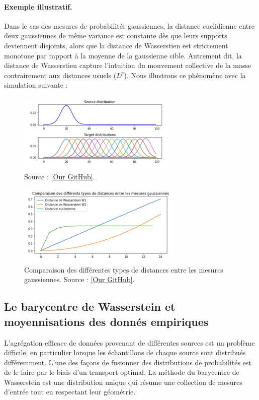 \documentclass[
    8.2pt,
    a4paper,
    logo,
    twocolumn
]{template}
\begin{document}
    \paragraph{Exemple illustratif.} Dans le cas des mesures de probabilités gaussiennes, la distance euclidienne entre deux gaussiennes de même variance est constante dès que leurs supports deviennent disjoints, alors que la distance de Wasserstien est strictement monotone par rapport à la moyenne de la gaussienne cible. Autrement dit, la distance de Wasserstien capture l’intuition du mouvement collective de la masse contrairement aux distances usuels ($L^p$). Nous illustrons ce phénomène avec la simulation suivante :


    \begin{figure}[H]
        \centering
        \includegraphics[width=.5\textwidth]{figures/Image5.png}
        \caption{Source : \href{https://github.com/maranibadr/tranport-optimal/blob/master/notebooks/TO_simulation_transport.ipynb}{[Our GitHub]}.}
        \label{fig:figureh}
    \end{figure}

    \begin{figure}[H]
        \centering
        \includegraphics[width=.5\textwidth]{figures/Image6.png}
        \caption{Comparaison des différentes types de distances entre les mesures gaussiennes. Source : \href{https://github.com/maranibadr/tranport-optimal/blob/master/notebooks/TO_simulation_transport.ipynb}{[Our GitHub]}.}
        \label{fig:figureh}
    \end{figure}

    \subsection{Le barycentre de Wasserstein  et moyennisations des donnés empiriques}
    L'agrégation efficace de données provenant de différentes sources est un problème difficile, en particulier lorsque les échantillons de chaque source sont distribués différemment. L'une des façons de fusionner des distributions de probabilités est de le faire par le biais d'un transport optimal.  La méthode du barycentre de Wasserstein \citep{gramfort_fast_2015} est une distribution unique qui résume une collection de mesures d'entrée tout en respectant leur géométrie.
\end{document}

